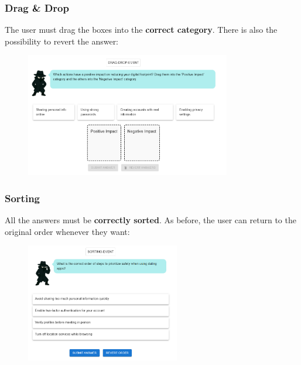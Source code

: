 \subsubsection{Drag \& Drop}
The user must drag the boxes into the \textbf{correct category}. There is also the possibility to revert the answer:
\begin{figure}[htbp]
    \centering
    \includegraphics[width=0.8\textwidth]{images/Drag_and_Drop.png}
\end{figure}

\subsubsection{Sorting}
All the answers must be \textbf{correctly sorted}. As before, the user can return to the original order whenever they want:
\begin{figure}[htbp]
    \centering
    \includegraphics[width=0.6\textwidth]{images/Sorting.png}
\end{figure}

